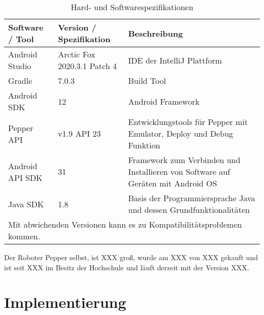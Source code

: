 \begin{table}[H]
    \caption{Hard- und Softwarespezifikationen}
    \label{table}
    \setlength{\tabcolsep}{3pt}
    \begin{tabular}{|p{100pt}|p{120pt}|p{180pt}|}
        \hline
        Software / Tool & Version / Spezifikation     & Beschreibung                                                                     \\
        \hline\hline
        Android Studio  & Arctic Fox 2020.3.1 Patch 4 & IDE der IntelliJ Plattform                                                       \\
        \hline
        Gradle          & 7.0.3                       & Build Tool                                                                       \\
        \hline
        Android SDK     & 12                          & Android Framework                                                                \\
        \hline
        Pepper API      & v1.9  API 23                & Entwicklungstools für Pepper mit Emulator, Deploy und Debug Funktion             \\
        \hline
        Android API SDK & 31                          & Framework zum Verbinden und Installieren von Software auf Geräten mit Android OS \\
        \hline
        Java SDK        & 1.8                         & Basis der Programmiersprache Java und dessen Grundfunktionalitäten               \\
        \hline
        \multicolumn{3}{p{380pt}}{Mit abwichenden Versionen kann es zu Kompatibilitätsproblemen kommen.}
    \end{tabular}
    \label{tab1}
\end{table}


Der Roboter Pepper selbst, ist XXX groß, wurde am XXX von XXX gekauft und ist seit XXX im Besitz der Hochschule
und läuft derzeit mit der Version XXX.

\section{Implementierung}


